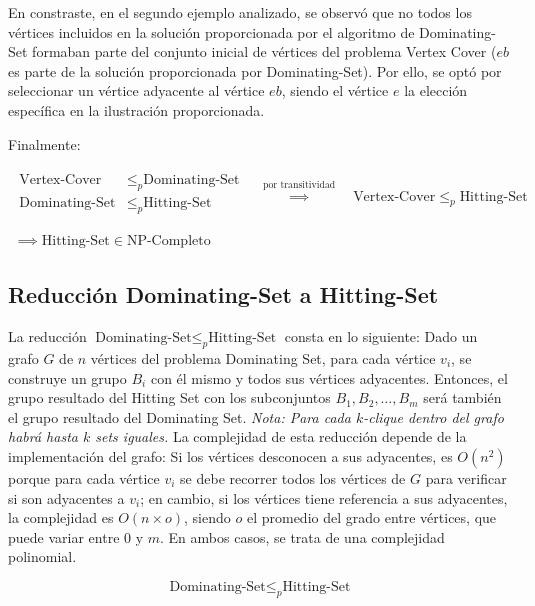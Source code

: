 En constraste, en el segundo ejemplo analizado, se observó que no todos los vértices incluidos en la solución proporcionada por el algoritmo de Dominating-Set formaban parte del conjunto inicial de vértices del problema Vertex Cover ($eb$ es parte de la solución proporcionada por Dominating-Set).
Por ello, se optó por seleccionar un vértice adyacente al vértice $eb$, siendo el vértice $e$ la elección específica en la ilustración proporcionada.

Finalmente:

\[
    \begin{array}{c}
        \begin{split}
            \text{Vertex-Cover}  & \leq _{p} \text{Dominating-Set} \\
            \text{Dominating-Set}  & \leq _{p} \text{Hitting-Set} \\
        \end{split}
        \quad \overset{ \text{por transitividad} }{ \implies  } \quad
        \text{Vertex-Cover}  \leq _{p} \text{Hitting-Set} \\ \\
        \implies \text{Hitting-Set} \in \text{NP-Completo}    
    \end{array}
\]

\subsection{Reducción Dominating-Set a Hitting-Set}

La reducción $\text{Dominating-Set} \leq_{p} \text{Hitting-Set}$ consta en lo siguiente:
Dado un grafo $G$ de $n$ vértices del problema Dominating Set, para cada vértice $v_{i}$, se construye un grupo $B_{i}$ con él mismo y todos sus vértices adyacentes. Entonces, el grupo resultado del Hitting Set con los subconjuntos $B_{1},B_{2},\dots,B_{m}$ será también el grupo resultado del Dominating Set. \textit{Nota: Para cada $k$-clique dentro del grafo habrá hasta $k$ sets iguales.} La complejidad de esta reducción depende de la implementación del grafo: Si los vértices desconocen a sus adyacentes, es $O(n^{2})$ porque para cada vértice $v_{i}$ se debe recorrer todos los vértices de $G$ para verificar si son adyacentes a $v_{i}$; en cambio, si los vértices tiene referencia a sus adyacentes, la complejidad es $O(n\times o)$, siendo $o$ el promedio del grado entre vértices, que puede variar entre $0$ y $m$. En ambos casos, se trata de una complejidad polinomial.

\[\text{Dominating-Set}  \leq _{p} \text{Hitting-Set}\]

